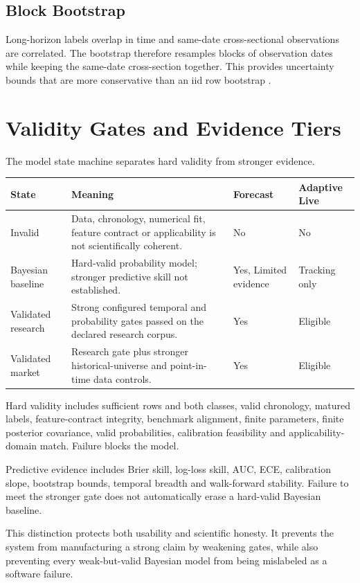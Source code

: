 \documentclass[11pt]{article}
\begin{document}
\subsection{Block Bootstrap}
Long-horizon labels overlap in time and same-date cross-sectional observations are correlated. The bootstrap therefore resamples blocks of observation dates while keeping the same-date cross-section together. This provides uncertainty bounds that are more conservative than an iid row bootstrap \citep{kunsch1989jackknife,politis1994stationary}.

\section{Validity Gates and Evidence Tiers}
The model state machine separates hard validity from stronger evidence.

\begin{longtable}{p{}p{}p{}p{}}
\toprule
State & Meaning & Forecast & Adaptive Live\\
\midrule
\endhead
Invalid & Data, chronology, numerical fit, feature contract or applicability is not scientifically coherent. & No & No\\
Bayesian baseline & Hard-valid probability model; stronger predictive skill not established. & Yes, Limited evidence & Tracking only\\
Validated research & Strong configured temporal and probability gates passed on the declared research corpus. & Yes & Eligible\\
Validated market & Research gate plus stronger historical-universe and point-in-time data controls. & Yes & Eligible\\
\bottomrule
\end{longtable}

Hard validity includes sufficient rows and both classes, valid chronology, matured labels, feature-contract integrity, benchmark alignment, finite parameters, finite posterior covariance, valid probabilities, calibration feasibility and applicability-domain match. Failure blocks the model.

Predictive evidence includes Brier skill, log-loss skill, AUC, ECE, calibration slope, bootstrap bounds, temporal breadth and walk-forward stability. Failure to meet the stronger gate does not automatically erase a hard-valid Bayesian baseline.

This distinction protects both usability and scientific honesty. It prevents the system from manufacturing a strong claim by weakening gates, while also preventing every weak-but-valid Bayesian model from being mislabeled as a software failure.
\end{document}

